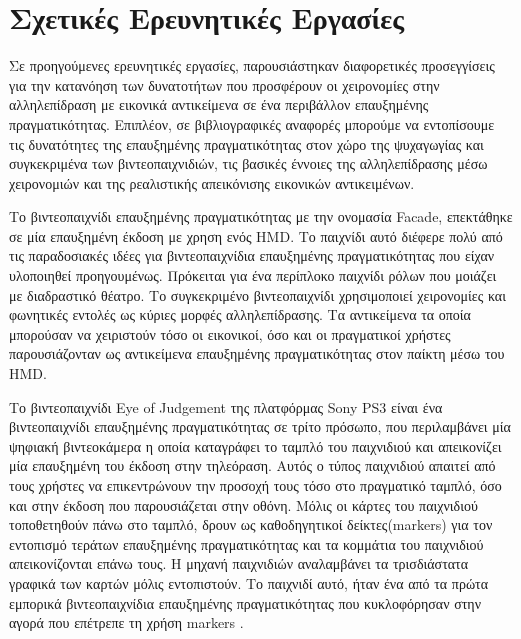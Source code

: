 \section{Σχετικές Ερευνητικές Εργασίες}


Σε προηγούμενες ερευνητικές εργασίες, παρουσιάστηκαν διαφορετικές προσεγγίσεις για την κατανόηση των δυνατοτήτων που προσφέρουν οι χειρονομίες στην αλληλεπίδραση με εικονικά αντικείμενα σε ένα περιβάλλον επαυξημένης πραγματικότητας. Επιπλέον, σε βιβλιογραφικές αναφορές μπορούμε να εντοπίσουμε τις δυνατότητες της επαυξημένης πραγματικότητας στον χώρο της ψυχαγωγίας και συγκεκριμένα των βιντεοπαιχνιδιών, τις βασικές έννοιες της αλληλεπίδρασης μέσω χειρονομιών και της ρεαλιστικής απεικόνισης εικονικών αντικειμένων.




Το βιντεοπαιχνίδι επαυξημένης πραγματικότητας με την ονομασία Facade, επεκτάθηκε σε μία επαυξημένη έκδοση με χρηση ενός HMD. Το παιχνίδι αυτό \cite{Dow2007} διέφερε πολύ από τις παραδοσιακές ιδέες για βιντεοπαιχνίδια επαυξημένης πραγματικότητας που είχαν υλοποιηθεί προηγουμένως. Πρόκειται για ένα περίπλοκο παιχνίδι ρόλων που μοιάζει με διαδραστικό θέατρο. Το συγκεκριμένο βιντεοπαιχνίδι χρησιμοποιεί χειρονομίες και φωνητικές εντολές ως κύριες μορφές αλληλεπίδρασης. Τα αντικείμενα τα οποία μπορούσαν να χειριστούν τόσο οι εικονικοί, όσο και οι πραγματικοί χρήστες παρουσιάζονταν ως αντικείμενα επαυξημένης πραγματικότητας στον παίκτη μέσω του HMD.


Το βιντεοπαιχνίδι Eye of Judgement της πλατφόρμας Sony PS3 είναι ένα βιντεοπαιχνίδι επαυξημένης πραγματικότητας σε τρίτο πρόσωπο, που περιλαμβάνει μία ψηφιακή βιντεοκάμερα η οποία καταγράφει το ταμπλό του παιχνιδιού και απεικονίζει μία επαυξημένη του έκδοση στην τηλεόραση. Αυτός ο τύπος παιχνιδιού απαιτεί από τους χρήστες να επικεντρώνουν την προσοχή τους τόσο στο πραγματικό ταμπλό, όσο και στην έκδοση που παρουσιάζεται στην οθόνη. Μόλις οι κάρτες του παιχνιδιού τοποθετηθούν πάνω στο ταμπλό, δρουν ως καθοδηγητικοί δείκτες(markers) για τον εντοπισμό τεράτων επαυξημένης πραγματικότητας και τα κομμάτια του παιχνιδιού απεικονίζονται επάνω τους. Η μηχανή παιχνιδιών αναλαμβάνει τα τρισδιάστατα γραφικά των καρτών μόλις εντοπιστούν. Το παιχνιδί αυτό, ήταν ένα από τα πρώτα εμπορικά βιντεοπαιχνίδια επαυξημένης πραγματικότητας που κυκλοφόρησαν στην αγορά που επέτρεπε τη χρήση markers \cite{Thomas2012}.



